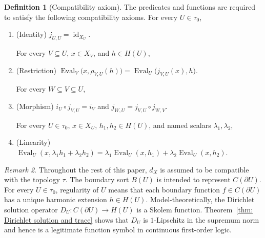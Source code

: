 \documentclass{amsart}
\theoremstyle{definition}
\newtheorem{definition}{Definition}[section]
\theoremstyle{remark}
\newtheorem{remark}[definition]{Remark}
\numberwithin{equation}{section}
\begin{document}
	\begin{definition}[Compatibility axiom] \label{def: Compatibility axiom}
		The predicates and functions are required to satisfy the following compatibility axioms. For every $U\in\tau_0$,
		\begin{enumerate}
			\item (Identity) $j_{U,U}=\operatorname{id}_{X_U}$.

            For every $V\subseteq U$, $x\in X_V$, and
			$h\in H(U)$,
			\item (Restriction) $
			\operatorname{Eval}_V\bigl(x,\rho_{V,U}(h)\bigr)
			=
			\operatorname{Eval}_U\bigl(j_{V,U}(x),h\bigr).
			$

            For every $W\subseteq V\subseteq U$,
			\item (Morphism) 
			$i_U\circ j_{V,U}=i_V$ and
			$j_{W,U}=j_{V,U}\circ j_{W,V}$.

            For every $U\in\tau_0$, $x\in X_U$,
			$h_1,h_2\in H(U)$, and named scalars $\lambda_1,\lambda_2$,
            
			\item (Linearity) 
			$\operatorname{Eval}_U(x,\lambda_1 h_1+\lambda_2 h_2)
			=
			\lambda_1\operatorname{Eval}_U(x,h_1)
			+
			\lambda_2\operatorname{Eval}_U(x,h_2).$
		\end{enumerate}
	\end{definition}
	
	
	
	
	\begin{remark} Throughout the rest of this paper, $d_X$ is assumed to be compatible with the topology $\tau$. The boundary sort $B(U)$ is intended to represent $C(\partial U)$. For every $U\in\tau_0$, regularity of $U$ means that each boundary function $f\in C(\partial U)$ has a unique harmonic extension $h\in H(U)$. Model-theoretically, the Dirichlet solution operator $D_U:C(\partial U)\to H(U)$ is a Skolem function. Theorem~\ref{thm: Dirichlet solution and trace} shows that $D_U$ is $1$-Lipschitz in the supremum norm and hence is a legitimate function symbol in continuous first-order logic. \end{remark}
	
\end{document}

